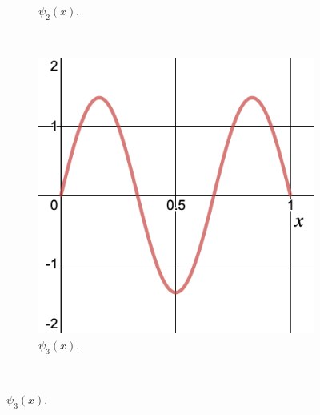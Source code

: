 \begin{figure}[H]
\begin{subfigure}[h]{0.3\textwidth}
        \caption{$\psi_2(x)$.}
    \end{subfigure}
    ~
    \begin{subfigure}[h]{0.3\textwidth}
        \includegraphics[width=\textwidth]{Figures_Part_2/state_3.png}
        \caption{$\psi_3(x)$.}
    \end{subfigure}\\
    

\end{figure}
